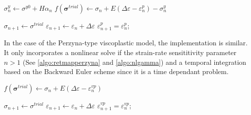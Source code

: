 \documentclass[final,5p,times,twocolumn]{elsarticle}
\begin{document}
\begin{algorithm}
  $\sigma_n^y \gets \sigma^{y0} + H\alpha_n$\;
  $f(\boldsymbol{\sigma}^{trial}) \gets \sigma_n + E(\Delta\varepsilon - \varepsilon^p_n) - \sigma^y_n$\;
  {
    $\sigma_{n+1} \gets \sigma^{trial}$\;
    $\varepsilon_{n+1} \gets \varepsilon_n + \Delta\varepsilon$\;
    $\varepsilon_{n+1}^p=\varepsilon^p_n$;

  }
  
  \;
  \caption{{\sc LinearHardeningReturnMapping} Solve the stress state for next stress increment using return mapping for the linear hardening elasto-plastic model}
  \label{algo:linhard}
\end{algorithm}

In the case of the Perzyna-type viscoplastic model, the implementation is similar. It only incorporates a nonlinear solve if the strain-rate sensititivity parameter $n > 1$ (See \cref{algo:retmapperzyna} and \cref{algo:nlgamma}) and a temporal integration based on the Backward Euler scheme since it is a time dependant problem.

\begin{algorithm}
  $f(\boldsymbol{\sigma}^{trial}) \gets \sigma_n + E(\Delta\varepsilon - \varepsilon^{vp}_n)$\;
  {
    $\sigma_{n+1} \gets \sigma^{trial}$\;
    $\varepsilon_{n+1} \gets \varepsilon_n + \Delta\varepsilon$\;
    $\varepsilon_{n+1}^{vp}=\varepsilon^{vp}_n$;

  }
  
  \;
  \caption{{\sc PerzynaReturnMapping} Solve the stress state for next stress increment using return mapping for the Perzyna-type viscoplastic model}
  \label{algo:retmapperzyna}
\end{algorithm}
\end{document}
